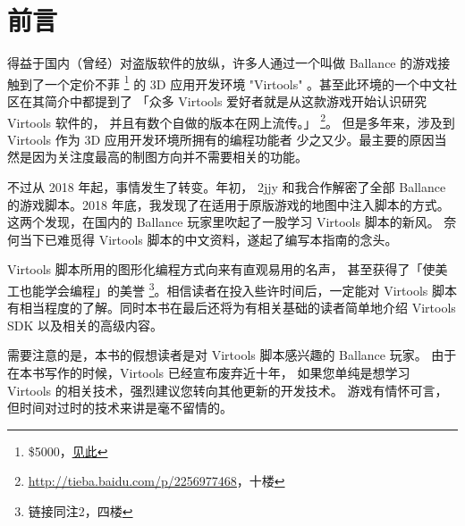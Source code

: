 \clearpage
{}
\chapter*{前言}
得益于国内（曾经）对盗版软件的放纵，许多人通过一个叫做 Ballance
的游戏接触到了一个定价不菲%
\footnote{\$5000，\underline{\href{https://web.archive.org/web/20151016140349/http://www.gamasutra.com/view/feature/131377/product_review_virtools_dev_20.php}{见此}}}%
的 3D 应用开发环境 "Virtools" 。甚至此环境的一个中文社区在其简介中都提到了%
「众多 Virtools 爱好者就是从这款游戏开始认识研究 Virtools 软件的，%
并且有数个自做的版本在网上流传。」%
\footnote{\underline{\url{http://tieba.baidu.com/p/2256977468}}，十楼}。%
但是多年来，涉及到 Virtools 作为 3D 应用开发环境所拥有的编程功能者%
少之又少。最主要的原因当然是因为关注度最高的制图方向并不需要相关的功能。
\par
不过从 2018 年起，事情发生了转变。年初， 2jjy 和我合作解密了全部 Ballance
的游戏脚本。2018 年底，我发现了在适用于原版游戏的地图中注入脚本的方式。%
这两个发现，在国内的 Ballance 玩家里吹起了一股学习 Virtools 脚本的新风。%
奈何当下已难觅得 Virtools 脚本的中文资料，遂起了编写本指南的念头。
\par
Virtools 脚本所用的图形化编程方式向来有直观易用的名声，%
甚至获得了「使美工也能学会编程」的美誉%
\footnote{链接同注2，四楼}。相信读者在投入些许时间后，一定能对 Virtools
脚本有相当程度的了解。同时本书在最后还将为有相关基础的读者简单地介绍
Virtools SDK 以及相关的高级内容。
\par
需要注意的是，本书的假想读者是对 Virtools 脚本感兴趣的 Ballance 玩家。%
由于在本书写作的时候，Virtools 已经宣布废弃近十年，
如果您单纯是想学习 Virtools 的相关技术，强烈建议您转向其他更新的开发技术。%
游戏有情怀可言，但时间对过时的技术来讲是毫不留情的。
\clearpage
